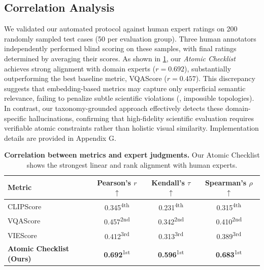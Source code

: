 \documentclass[runningheads]{llncs}
\begin{document}
\subsection{Correlation Analysis}
\label{sec:correlation}
We validated our automated protocol against human expert ratings on 200 randomly sampled test cases (50 per evaluation group). Three human annotators independently performed blind scoring on these samples, with final ratings determined by averaging their scores. As shown in \cref{tab:human_correlation}, our \textit{Atomic Checklist} achieves strong alignment with domain experts ($r=0.692$), substantially outperforming the best baseline metric, VQAScore ($r=0.457$). This discrepancy suggests that embedding-based metrics may capture only superficial semantic relevance, failing to penalize subtle scientific violations (\eg, impossible topologies). In contrast, our taxonomy-grounded approach effectively detects these domain-specific hallucinations, confirming that high-fidelity scientific evaluation requires verifiable atomic constraints rather than holistic visual similarity. Implementation details are provided in Appendix G.


\begin{table}[t]
\caption{\textbf{Correlation between metrics and expert judgments.} Our Atomic Checklist shows the strongest linear and rank alignment with human experts.}
\label{tab:human_correlation}
\centering
\small
\begin{tabular}{lccc}
\toprule
\textbf{Metric} & \textbf{Pearson's $r$} $\uparrow$ & \textbf{Kendall's $\tau$} $\uparrow$ & \textbf{Spearman's $\rho$} $\uparrow$ \\
\midrule
CLIPScore\cite{hessel2021clipscore} & 0.345\textsuperscript{\tiny 4th} & 0.231\textsuperscript{\tiny 4th} & 0.315\textsuperscript{\tiny 4th} \\
VQAScore\cite{lin2024evaluating} & 0.457\textsuperscript{\tiny 2nd} & 0.342\textsuperscript{\tiny 2nd} & 0.410\textsuperscript{\tiny 2nd} \\
VIEScore\cite{ku2024viescore} & 0.412\textsuperscript{\tiny 3rd} & 0.313\textsuperscript{\tiny 3rd} & 0.389\textsuperscript{\tiny 3rd} \\
\midrule
\rowcolor{gray!20}
\textbf{Atomic Checklist (Ours)} & \textbf{0.692}\textsuperscript{\tiny 1st} & \textbf{0.596}\textsuperscript{\tiny 1st} & \textbf{0.683}\textsuperscript{\tiny 1st} \\
\bottomrule
\end{tabular}
\end{table}
\end{document}
